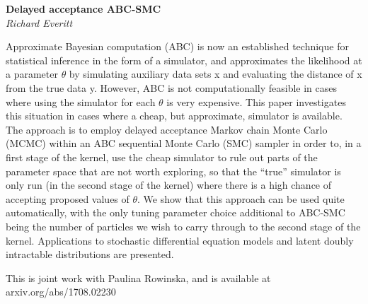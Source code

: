\documentclass[12pt]{article}
\newcommand{\postertitle}[1]{{\Large\bf #1}\\[12pt]}
\newcommand{\authors}[1]{\emph{#1}\\}
\begin{document}
\begin{center}
\vspace*{0.5cm}
%
\postertitle{Delayed acceptance ABC-SMC}
%
\authors{Richard Everitt} %
%
\vspace*{0.3cm}
\end{center}

Approximate Bayesian computation (ABC) is now an established technique for statistical inference in the form of a simulator, and approximates the likelihood at a parameter $\theta$ by simulating auxiliary data sets x and evaluating the distance of x from the true data y. However, ABC is not computationally feasible in cases where using the simulator for each $\theta$ is very expensive. This paper investigates this situation in cases where a cheap, but approximate, simulator is available. The approach is to employ delayed acceptance Markov chain Monte Carlo (MCMC) within an ABC sequential Monte Carlo (SMC) sampler in order to, in a first stage of the kernel, use the cheap simulator to rule out parts of the parameter space that are not worth exploring, so that the ``true'' simulator is only run (in the second stage of the kernel) where there is a high chance of accepting proposed values of $\theta$. We show that this approach can be used quite automatically, with the only tuning parameter choice additional to ABC-SMC being the number of particles we wish to carry through to the second stage of the kernel. Applications to stochastic differential equation models and latent doubly intractable distributions are presented.

This is joint work with Paulina Rowinska, and is available at arxiv.org/abs/1708.02230
\end{document}
